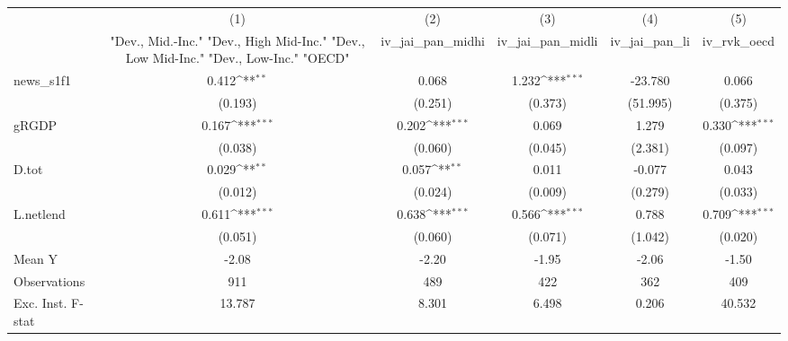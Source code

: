 {
\def\sym#1{\ifmmode^{#1}\else\(^{#1}\)\fi}
\begin{tabular}{l*{5}{c}}
\toprule
            &\multicolumn{1}{c}{(1)}&\multicolumn{1}{c}{(2)}&\multicolumn{1}{c}{(3)}&\multicolumn{1}{c}{(4)}&\multicolumn{1}{c}{(5)}\\
            &\multicolumn{1}{c}{ "Dev., Mid.-Inc." "Dev., High Mid-Inc." "Dev., Low Mid-Inc." "Dev., Low-Inc." "OECD" }&\multicolumn{1}{c}{iv\_jai\_pan\_midhi}&\multicolumn{1}{c}{iv\_jai\_pan\_midli}&\multicolumn{1}{c}{iv\_jai\_pan\_li}&\multicolumn{1}{c}{iv\_rvk\_oecd}\\
\midrule
news\_s1f1   &       0.412\sym{**} &       0.068         &       1.232\sym{***}&     -23.780         &       0.066         \\
            &     (0.193)         &     (0.251)         &     (0.373)         &    (51.995)         &     (0.375)         \\
\addlinespace
gRGDP       &       0.167\sym{***}&       0.202\sym{***}&       0.069         &       1.279         &       0.330\sym{***}\\
            &     (0.038)         &     (0.060)         &     (0.045)         &     (2.381)         &     (0.097)         \\
\addlinespace
D.tot       &       0.029\sym{**} &       0.057\sym{**} &       0.011         &      -0.077         &       0.043         \\
            &     (0.012)         &     (0.024)         &     (0.009)         &     (0.279)         &     (0.033)         \\
\addlinespace
L.netlend   &       0.611\sym{***}&       0.638\sym{***}&       0.566\sym{***}&       0.788         &       0.709\sym{***}\\
            &     (0.051)         &     (0.060)         &     (0.071)         &     (1.042)         &     (0.020)         \\
\midrule
Mean Y      &       -2.08         &       -2.20         &       -1.95         &       -2.06         &       -1.50         \\
Observations&         911         &         489         &         422         &         362         &         409         \\
Exc. Inst. F-stat&      13.787         &       8.301         &       6.498         &       0.206         &      40.532         \\
\bottomrule
\end{tabular}
}
